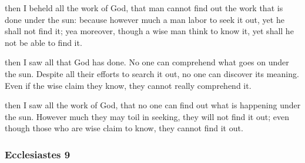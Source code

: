 			\begin{versebox}
					\item[BHS] 
					\item[LXX] 
					\item[ASV] then I beheld all the work of God, that man cannot find out the work that is done under the sun: because however much a man labor to seek it out, yet he shall not find it; yea moreover, though a wise man think to know it, yet shall he not be able to find it.
					\item[NIV] then I saw all that God has done. No one can comprehend what goes on under the sun. Despite all their efforts to search it out, no one can discover its meaning. Even if the wise claim they know, they cannot really comprehend it.
					\item[NRSV] then I saw all the work of God, that no one can find out what is happening under the sun. However much they may toil in seeking, they will not find it out; even though those who are wise claim to know, they cannot find it out.
			\end{versebox}
	\subsubsection{Ecclesiastes 9} %
		\label{ECCLESIASTES-9}

